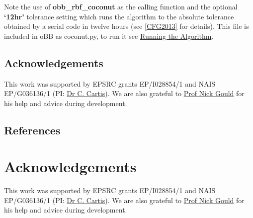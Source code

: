 \documentclass[letterpaper,11pt,openany,oneside]{sphinxmanual}
\begin{document}
Note the use of \textbf{obb\_rbf\_coconut} as the calling function and the optional \textbf{`12hr'} tolerance setting which runs the algorithm to the absolute tolerance obtained by a serial code in twelve hours (see {\hyperref[userguide:cfg2013]{{[}CFG2013{]}}} for details). This file is included in oBB as coconut.py, to run it see {\hyperref[userguide:running-the-algorithm]{Running the Algorithm}}.


\section{Acknowledgements}
\label{userguide:acknowledgements}
This work was supported by EPSRC grants EP/I028854/1 and NAIS EP/G036136/1 (PI: \href{http://www.maths.ox.ac.uk/people/profiles/coralia.cartis}{Dr C. Cartis}).
We are also grateful to \href{http://www.numerical.rl.ac.uk/people/nimg/}{Prof Nick Gould} for his help and advice during development.


\section{References}
\label{userguide:references}

\chapter{Acknowledgements}
\label{index:acknowledgements}
This work was supported by EPSRC grants EP/I028854/1 and NAIS EP/G036136/1 (PI: \href{http://www.maths.ox.ac.uk/people/profiles/coralia.cartis}{Dr C. Cartis}).
We are also grateful to \href{http://www.numerical.rl.ac.uk/people/nimg/}{Prof Nick Gould} for his help and advice during development.

\begin{thebibliography}{CFG2013}
\end{thebibliography}



\renewcommand{\indexname}{Index}
\printindex
\end{document}
